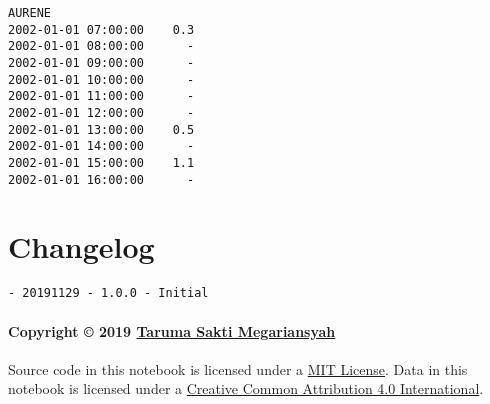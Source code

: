 \documentclass[11pt]{article}
\makeatletter
\newcommand{\boxspacing}{\kern\kvtcb@left@rule\kern\kvtcb@boxsep}
\newcommand{\prompt}[4]{
        {\ttfamily\llap{{\color{#2}[#3]:\hspace{3pt}#4}}\vspace{-\baselineskip}}
    }
\makeatother
\begin{document}
            \begin{tcolorbox}[breakable, size=fbox, boxrule=.5pt, pad at break*=1mm, opacityfill=0]
\prompt{Out}{outcolor}{ }{\boxspacing}
\begin{Verbatim}[commandchars=\\\{\}]
                    AURENE
2002-01-01 07:00:00    0.3
2002-01-01 08:00:00      -
2002-01-01 09:00:00      -
2002-01-01 10:00:00      -
2002-01-01 11:00:00      -
2002-01-01 12:00:00      -
2002-01-01 13:00:00    0.5
2002-01-01 14:00:00      -
2002-01-01 15:00:00    1.1
2002-01-01 16:00:00      -
\end{Verbatim}
\end{tcolorbox}
        
    \hypertarget{changelog}{%
\section{Changelog}\label{changelog}}

\begin{verbatim}
- 20191129 - 1.0.0 - Initial
\end{verbatim}

\hypertarget{copyright-2019-taruma-sakti-megariansyah}{%
\paragraph{\texorpdfstring{Copyright © 2019
\href{https://taruma.github.io}{Taruma Sakti
Megariansyah}}{Copyright © 2019 Taruma Sakti Megariansyah}}\label{copyright-2019-taruma-sakti-megariansyah}}

Source code in this notebook is licensed under a
\href{https://choosealicense.com/licenses/mit/}{MIT License}. Data in
this notebook is licensed under a
\href{https://creativecommons.org/licenses/by/4.0/}{Creative Common
Attribution 4.0 International}.


    
    
    
\end{document}

